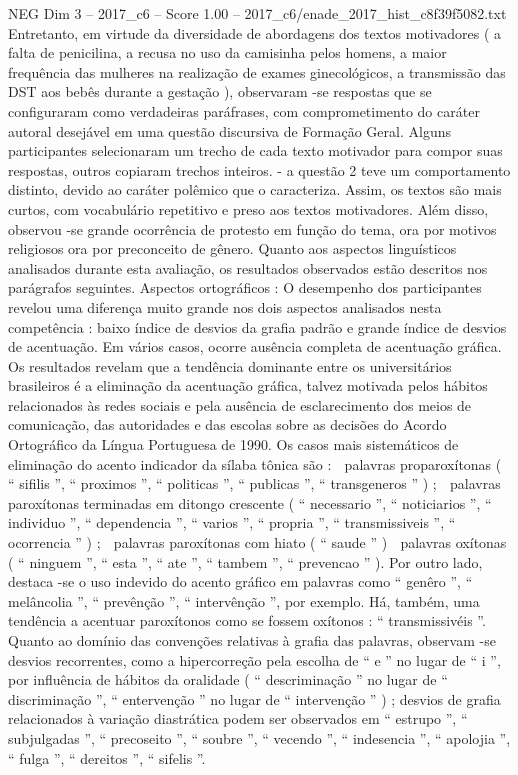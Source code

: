 \begin{textsample}{NEG Dim 3 – 2017\_c6 – Score 1.00 – 2017\_c6/enade\_2017\_hist\_c8f39f5082.txt}
Entretanto, em virtude da diversidade de abordagens dos textos motivadores ( a falta de penicilina, a recusa no uso da camisinha pelos homens, a maior frequência das mulheres na realização de exames ginecológicos, a transmissão das DST aos bebês durante a gestação ), observaram -se respostas que se configuraram como verdadeiras paráfrases, com comprometimento do caráter autoral desejável em uma questão discursiva de Formação Geral.
Alguns participantes selecionaram um trecho de cada texto motivador para compor suas respostas, outros copiaram trechos inteiros. - a questão 2 teve um comportamento distinto, devido ao caráter polêmico que o caracteriza.
Assim, os textos são mais curtos, com vocabulário repetitivo e preso aos textos motivadores.
Além disso, observou -se grande ocorrência de protesto em função do tema, ora por motivos religiosos ora por preconceito de gênero.
Quanto aos aspectos linguísticos analisados durante esta avaliação, os resultados observados estão descritos nos parágrafos seguintes.
Aspectos ortográficos : O desempenho dos participantes revelou uma diferença muito grande nos dois aspectos analisados nesta competência : baixo índice de desvios da grafia padrão e grande índice de desvios de acentuação.
Em vários casos, ocorre ausência completa de acentuação gráfica.
Os resultados revelam que a tendência dominante entre os universitários brasileiros é a eliminação da acentuação gráfica, talvez motivada pelos hábitos relacionados às redes sociais e pela ausência de esclarecimento dos meios de comunicação, das autoridades e das escolas sobre as decisões do Acordo Ortográfico da Língua Portuguesa de 1990.
Os casos mais sistemáticos de eliminação do acento indicador da sílaba tônica são :  palavras proparoxítonas ( “ sifilis ”, “ proximos ”, “ politicas ”, “ publicas ”, “ transgeneros ” ) ;  palavras paroxítonas terminadas em ditongo crescente ( “ necessario ”, “ noticiarios ”, “ individuo ”, “ dependencia ”, “ varios ”, “ propria ”, “ transmissiveis ”, “ ocorrencia ” ) ;  palavras paroxítonas com hiato ( “ saude ” )  palavras oxítonas ( “ ninguem ”, “ esta ”, “ ate ”, “ tambem ”, “ prevencao ” ).
Por outro lado, destaca -se o uso indevido do acento gráfico em palavras como “ genêro ”, “ melâncolia ”, “ prevênção ”, “ intervênção ”, por exemplo.
Há, também, uma tendência a acentuar paroxítonos como se fossem oxítonos : “ transmissivéis ”.
Quanto ao domínio das convenções relativas à grafia das palavras, observam -se desvios recorrentes, como a hipercorreção pela escolha de “ e ” no lugar de “ i ”, por influência de hábitos da oralidade ( “ descriminação ” no lugar de “ discriminação ”, “ entervenção ” no lugar de “ intervenção ” ) ; desvios de grafia relacionados à variação diastrática podem ser observados em “ estrupo ”, “ subjulgadas ”, “ precoseito ”, “ soubre ”, “ vecendo ”, “ indesencia ”, “ apolojia ”, “ fulga ”, “ dereitos ”, “ sifelis ”.

\end{textsample}
